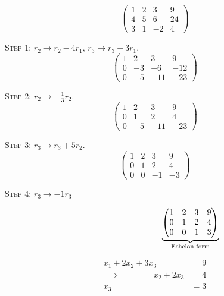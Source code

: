 \documentclass[10pt]{scrartcl}
\begin{document}
\setcounter{equation}{3}
\begin{example}[Revisited]
\[
  \begin{pmatrix}
   1 & 2 & 3 & 9\\
   4 & 5 & 6 & 24\\
   3 & 1 & -2 & 4	
  \end{pmatrix}
\]

\textsc{Step 1:} $r_2 \longrightarrow r_2 -4r_1$, $r_3 \longrightarrow r_3-3r_1$. 
\[
  \begin{pmatrix}
  1 & 2 & 3 & 9 \\
  0 & -3 & -6 & -12\\
  0 & -5 & -11 & -23	
  \end{pmatrix}
\]

\textsc{Step 2:} $r_2 \longrightarrow -\frac{1}{3}r_2$.
\[
  \begin{pmatrix}
  1 & 2 & 3 & 9\\
  0 & 1 & 2 & 4\\
  0 & -5 & -11 & -23	
  \end{pmatrix}
\]

\textsc{Step 3:} $r_3 \longrightarrow r_3 + 5r_2$. 
\[
  \begin{pmatrix}
  1 & 2 & 3 & 9\\
  0 & 1 & 2 & 4\\
  0 & 0 & -1 & -3	
  \end{pmatrix}
\]

\textsc{Step 4:} $r_3 \longrightarrow -1r_3$\\[0.1cm]
\begin{minipage}{6cm}
\[\hspace*{3cm}
\underbrace{\begin{pmatrix}
  1 & 2 & 3 & 9\\
  0 & 1 & 2 & 4\\
  0 & 0 & 1 & 3
  \end{pmatrix}}_{\text{Echelon form}}
\]
\end{minipage}
\begin{minipage}{3cm}
\begin{align*}
	x_1 + 2x_2 + 3x_3 &= 9\\
  \implies \qquad \qquad x_2 + 2x_3 &= 4\\
  x_3 &= 3
\end{align*}
\vspace*{10pt}
	
\end{minipage}

\end{example}\vspace*{5pt}
\end{document}
